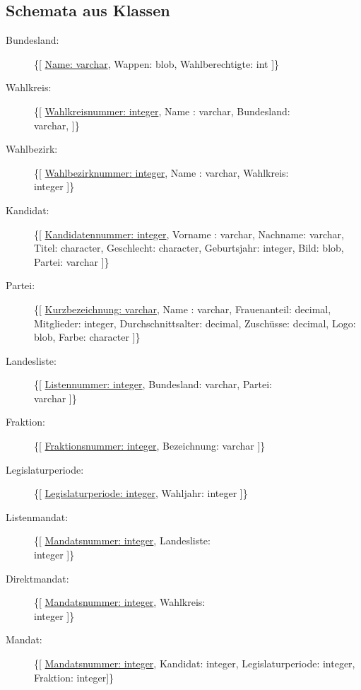 \documentclass[a4paper]{article}
\begin{document}
\subsection{Schemata aus Klassen}

\begin{description}

\item[Bundesland:] \{[ \underline{Name: varchar}, Wappen: blob, Wahlberechtigte: int  ]\}

\item[Wahlkreis:] \{[ \underline{Wahlkreisnummer: integer}, Name : varchar, Bundesland: \\varchar,   ]\}

\item[Wahlbezirk:] \{[ \underline{Wahlbezirknummer: integer}, Name : varchar, Wahlkreis:\\integer  ]\}

\item[Kandidat:] \{[ \underline{Kandidatennummer: integer}, Vorname : varchar, Nachname: varchar, Titel: character, Geschlecht: character, Geburtsjahr: integer, Bild: blob, Partei: varchar  ]\}

\item[Partei:] \{[ \underline{Kurzbezeichnung: varchar}, Name : varchar, Frauenanteil: decimal, Mitglieder: integer, Durchschnittsalter: decimal, Zuschüsse: decimal, Logo: blob, Farbe: character  ]\}

\item[Landesliste:] \{[ \underline{Listennummer: integer}, Bundesland: varchar, Partei: \\varchar ]\}

\item[Fraktion:] \{[ \underline{Fraktionsnummer: integer}, Bezeichnung: varchar ]\}

\item[Legislaturperiode:] \{[ \underline{Legislaturperiode: integer}, Wahljahr: integer ]\}

\item[Listenmandat:] \{[ \underline{Mandatsnummer: integer}, Landesliste: \\integer ]\}

\item[Direktmandat:] \{[ \underline{Mandatsnummer: integer}, Wahlkreis: \\integer ]\}

\item[Mandat:] \{[ \underline{Mandatsnummer: integer}, Kandidat: integer, Legislaturperiode: integer, Fraktion: integer]\}


\end{description}
\end{document}
